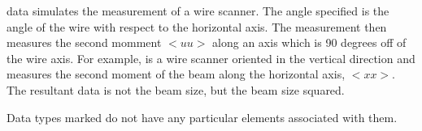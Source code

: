  data simulates the measurement of a wire scanner. The angle specified
is the angle of the wire with respect to the horizontal axis. The measurement
then measures the second momment $<uu>$ along an axis which is 90 degrees off of
the wire axis. For example,  is a wire scanner oriented in the
vertical direction and measures the second moment of the beam along the
horizontal axis, $<xx>$. The resultant data is not the beam size, but the beam
size squared.

Data types marked  do not have any particular elements
associated with them.


